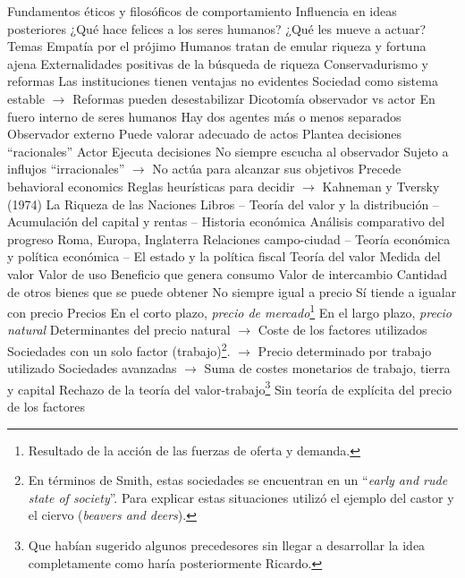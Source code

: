 \documentclass{nuevotema}
\begin{document}
\begin{esquemal}
				\4 Fundamentos éticos y filosóficos de comportamiento
				\4 Influencia en ideas posteriores
				\4 ¿Qué hace felices a los seres humanos?
				\4 ¿Qué les mueve a actuar?
			\3 Temas
				\4 Empatía por el prójimo
				\4 Humanos tratan de emular riqueza y fortuna ajena
				\4 Externalidades positivas de la búsqueda de riqueza
				\4 Conservadurismo y reformas
				\4[] Las instituciones tienen ventajas no evidentes
				\4 Sociedad como sistema estable
				\4[] $\to$ Reformas pueden desestabilizar
			\3 Dicotomía observador vs actor
				\4 En fuero interno de seres humanos
				\4[] Hay dos agentes más o menos separados
				\4 Observador externo
				\4[] Puede valorar adecuado de actos
				\4[] Plantea decisiones ``racionales''
				\4 Actor
				\4[] Ejecuta decisiones
				\4[] No siempre escucha al observador
				\4[] Sujeto a influjos ``irracionales''
				\4[] $\to$ No actúa para alcanzar sus objetivos
				\4 Precede behavioral economics
				\4[] Reglas heurísticas para decidir
				\4[] $\to$ Kahneman y Tversky (1974)
		\2 La Riqueza de las Naciones
			\3 Libros
				\4[I] -- Teoría del valor y la distribución
				\4[II] -- Acumulación del capital y rentas
				\4[III] -- Historia económica
				\4[] Análisis comparativo del progreso
				\4[] Roma, Europa, Inglaterra
				\4[] Relaciones campo-ciudad
				\4[IV] -- Teoría económica y política económica
				\4[V] -- El estado y la política fiscal
		\2 Teoría del valor
			\3 Medida del valor
				\4 Valor de uso
				\4[] Beneficio que genera consumo
				\4 Valor de intercambio
				\4[] Cantidad de otros bienes que se puede obtener
				\4[] No siempre igual a precio
				\4[] Sí tiende a igualar con precio
			\3 Precios
				\4 En el corto plazo, \textit{precio de mercado}\footnote{Resultado de la acción de las fuerzas de oferta y demanda.}
				\4[] En el largo plazo, \textit{precio natural}
				\4 Determinantes del precio natural
				\4[] $\to$ Coste de los factores utilizados
				\4[] Sociedades con un solo factor (trabajo)\footnote{En términos de Smith, estas sociedades se encuentran en un ``\textit{early and rude state of society}''. Para explicar estas situaciones utilizó el ejemplo del castor y el ciervo (\textit{beavers and deers}).}.
				\4[] $\to$ Precio determinado por trabajo utilizado
				\4[] Sociedades avanzadas
				\4[] $\to$ Suma de costes monetarios de trabajo, tierra y capital
				\4[] Rechazo de la teoría del valor-trabajo\footnote{Que habían sugerido algunos precedesores sin llegar a desarrollar la idea completamente como haría posteriormente Ricardo.}
				\4[] Sin teoría de explícita del precio de los factores

\end{esquemal}
\end{document}
